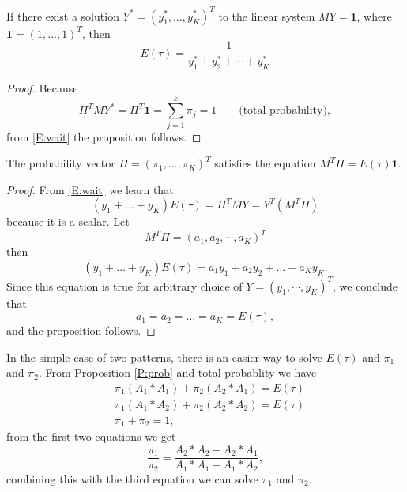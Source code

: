 \begin{proposition} \label{P:time}
If there exist a solution $Y^* = (y_1^*, \dots, y_K^*)^T$ to the linear system
$MY=\mathbf{1}$, where $\mathbf{1}=(1,\dots,1)^T$, then
\[
  E(\tau)=\frac{1}{y_1^* + y_2^* + \cdots + y_K^*}
\]
\end{proposition}
\begin{proof}
Because
\[
  \Pi^T M Y^* = \Pi^T \mathbf{1} = \sum_{j=1}^k \pi_j = 1  \qquad 
                \text{(total probability)},
\]
from \eqref{E:wait} the proposition follows.
\end{proof}

\begin{proposition} \label{P:prob}
The probability vector $\Pi = (\pi_1, \dots, \pi_K)^T$ satisfies the equation 
$M^T \Pi = E(\tau) \mathbf{1}$.
\end{proposition}
\begin{proof}
From \eqref{E:wait} we learn that
\[
  (y_1+\dots +y_K) E(\tau) = \Pi^T M Y = Y^T (M^T \Pi)
\]
because it is a scalar. Let 
\[
  M^T \Pi = (a_1, a_2, \cdots, a_K)^T
\]
then
\[
  (y_1+\dots +y_K) E(\tau) = a_1 y_1 + a_2 y_2 + \dots + a_K y_K.
\]
Since this equation is true for arbitrary choice of $Y=(y_1, \cdots, y_K)^T$,
we conclude that
\[
  a_1 = a_2 = \dots = a_K = E(\tau),
\]
and the proposition follows.

\end{proof}


\begin{remark}
In the simple case of two patterns, there is an easier way to solve $E(\tau)$
and $\pi_1$ and $\pi_2$. From Proposition \ref{P:prob} and total probablity we
have
\begin{align*}
  & \pi_1 (A_1\ast A_1) + \pi_2 (A_2\ast A_1) = E(\tau)  \\
  & \pi_1 (A_1\ast A_2) + \pi_2 (A_2\ast A_2) = E(\tau)  \\
  & \pi_1 + \pi_2 = 1,
\end{align*}
from the first two equations we get
\begin{equation}
  \frac{\pi_1}{\pi_2} = 
    \frac{A_2\ast A_2 - A_2\ast A_1}{A_1\ast A_1 - A_1\ast A_2},
\end{equation}
combining this with the third equation we can solve $\pi_1$ and $\pi_2$.
\end{remark}



